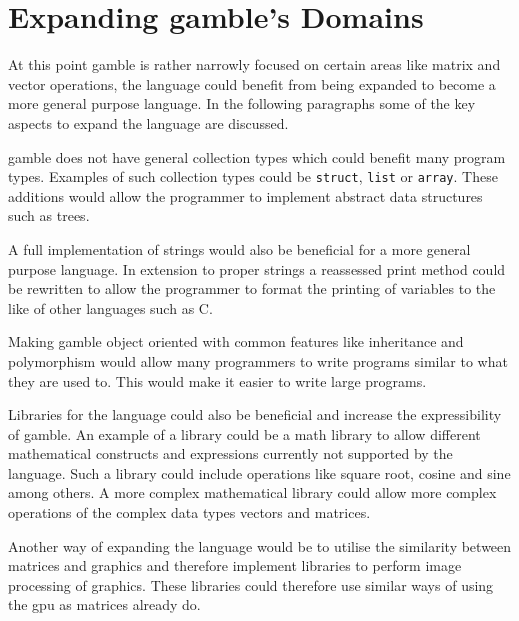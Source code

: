 \section{Expanding \gls{gamble}'s Domains}
At this point \gls{gamble} is rather narrowly focused on certain areas like matrix and vector operations, the language could benefit from being expanded to become a more general purpose language.
In the following paragraphs some of the key aspects to expand the language are discussed.

\gls{gamble} does not have general collection types which could benefit many program types.
Examples of such collection types could be \texttt{struct}, \texttt{list} or \texttt{array}.
These additions would allow the programmer to implement abstract data structures such as trees.

A full implementation of strings would also be beneficial for a more general purpose language.
In extension to proper strings a reassessed print method could be rewritten to allow the programmer to format the printing of variables to the like of other languages such as C.

Making \gls{gamble} object oriented with common features like inheritance and polymorphism would allow many programmers to write programs similar to what they are used to.
This would make it easier to write large programs.

Libraries for the language could also be beneficial and increase the expressibility of \gls{gamble}.
An example of a library could be a math library to allow different mathematical constructs and expressions currently not supported by the language.
Such a library could include operations like square root, cosine and sine among others.
A more complex mathematical library could allow more complex operations of the complex data types vectors and matrices.

Another way of expanding the language would be to utilise the similarity between matrices and graphics and therefore implement libraries to perform image processing of graphics.
These libraries could therefore use similar ways of using the \acrshort{gpu} as matrices already do.


